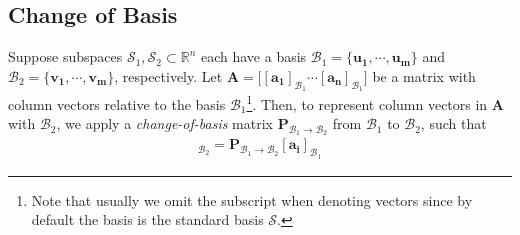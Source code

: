 \subsection{Change of Basis}

\begin{definition}
  \noindent Suppose subspaces $\mathcal{S}_1,\mathcal{S}_2\subset\mathbb{R}^n$ each have a basis $\mathcal{B}_1=\{\bm{u_1},\cdots,\bm{u_m}\}$ and $\mathcal{B}_2=\{\bm{v_1},\cdots,\bm{v_m}\}$, respectively. Let $\bm{A}=\Big[[\bm{a_1}]_{\mathcal{B}_1}\cdots[\bm{a_n}]_{\mathcal{B}_1}\Big]$ be a matrix with column vectors relative to the basis $\mathcal{B}_1$\footnote{Note that usually we omit the subscript when denoting vectors since by default the basis is the standard basis $\mathcal{S}$.}. Then, to represent column vectors in $\bm{A}$ with $\mathcal{B}_2$, we apply a \emph{change-of-basis} matrix $\bm{P}_{\mathcal{B}_1\rightarrow\mathcal{B}_2}$ from $\mathcal{B}_1$ to $\mathcal{B}_2$, such that 
  \begin{align}
    [\bm{a_i}]_{\mathcal{B}_2}=\bm{P}_{\mathcal{B}_1\rightarrow\mathcal{B}_2}[\bm{a_i}]_{\mathcal{B}_1}
  \end{align}
\end{definition}

